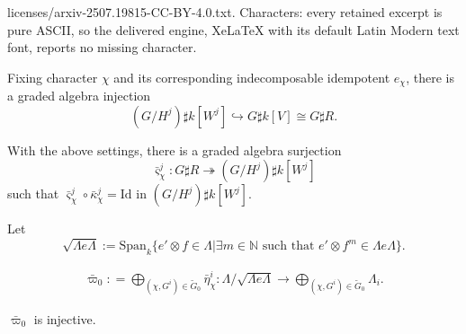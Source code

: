 \documentclass[10pt,a4paper]{amsart}
\begin{document}
licenses/arxiv-2507.19815-CC-BY-4.0.txt. Characters: every retained excerpt is pure ASCII, so the delivered engine, XeLaTeX with its default Latin Modern text font, reports no missing character.
\begin{lemma}\label{Inject}
Fixing character $\chi$
and
its corresponding indecomposable idempotent $e_{\chi}$, there is a graded algebra injection 
$$
(G / H^j) \sharp k[W^{j}] \hookrightarrow G \sharp k[V] \cong G \sharp R.
$$		
\end{lemma}

\begin{lemma}\label{Compos}
With the above settings, there is a graded algebra surjection
$$
	\bar{\varsigma}^{j}_{\chi}: G \sharp R  \twoheadrightarrow   (G / H^j) \sharp k[W^{j}]
$$
such that $\bar\varsigma^{j}_{\chi} \circ \bar\kappa^{j}_{\chi} 
= \mathrm{Id}$ in $(G / H^j) \sharp k[W^{j}]$. 
\end{lemma}

\begin{definition}\label{bdfbv11267}
Let
$$
\sqrt{\Lambda e\Lambda} := \mathrm{Span}_{k}\Big\{e' \otimes f 
\in \Lambda \big\vert \exists m \in \mathbb{N}
\mbox{ such that }
e' \otimes f^m \in \Lambda e\Lambda \Big\}. 
$$
\end{definition}

\begin{align}\label{jxkdbn}
\bar{\varpi}_0 : =  \bigoplus_{(\chi, G^i) \in \tilde{G}_0} \bar{\eta}^{i}_{\chi}: 
\Lambda / \sqrt{\Lambda e \Lambda} \rightarrow \bigoplus_{(\chi, G^i) \in \tilde{G}_0} \Lambda_i.
\end{align}

\begin{lemma}\label{NNned1}
$\bar{\varpi}_0$ is injective. 
\end{lemma}
\end{document}
